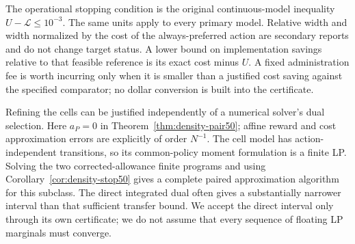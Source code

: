 The operational stopping condition is the original continuous-model inequality $U-\mathcal L\le10^{-3}$. The same units apply to every primary model. Relative width and width normalized by the cost of the always-preferred action are secondary reports and do not change target status. A lower bound on implementation savings relative to that feasible reference is its exact cost minus $U$. A fixed administration fee is worth incurring only when it is smaller than a justified cost saving against the specified comparator; no dollar conversion is built into the certificate.

Refining the cells can be justified independently of a numerical solver's dual selection. Here $a_P=0$ in Theorem~\ref{thm:density-pair50}; affine reward and cost approximation errors are explicitly of order $N^{-1}$. The cell model has action-independent transitions, so its common-policy moment formulation is a finite LP. Solving the two corrected-allowance finite programs and using Corollary~\ref{cor:density-stop50} gives a complete paired approximation algorithm for this subclass. The direct integrated dual often gives a substantially narrower interval than that sufficient transfer bound. We accept the direct interval only through its own certificate; we do not assume that every sequence of floating LP marginals must converge.

